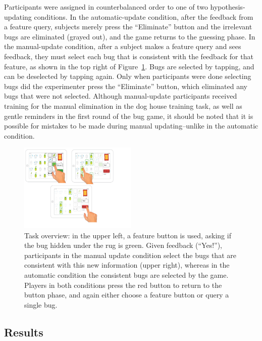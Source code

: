 \documentclass[10pt,letterpaper]{article}
\begin{document}
Participants were assigned in counterbalanced order to one of two hypothesis-
updating conditions. In the automatic-update condition, after the feedback from a 
feature query, subjects merely press the ``Eliminate'' button and the irrelevant bugs 
are eliminated (grayed out), and the game returns to the guessing phase. In the 
manual-update condition, after a subject makes a feature query and sees feedback, 
they must select each bug that is consistent with the feedback for that feature, as 
shown in the top right of Figure~\ref{fig:task-overview}. Bugs are selected by 
tapping, and can be deselected by tapping again. Only when participants were done 
selecting bugs did the experimenter press the ``Eliminate'' button, which eliminated 
any bugs that were not selected. Although manual-update participants received 
training for the manual elimination in the dog house training task, as well as gentle 
reminders in the first round of the bug game, it should be noted that it is possible for 
mistakes to be made during manual updating--unlike in the automatic condition.


\begin{figure}[!h]
  \centering
  \includegraphics[width=0.5\textwidth]{figures/task_overview}
  \caption{Task overview: in the upper left, a feature button is used, asking if the bug 
hidden under the rug is green. Given feedback (``Yes!''), participants in the manual 
update condition select the bugs that are consistent with this new information (upper 
right), whereas in the automatic condition the consistent bugs are selected by the 
game. Players in both conditions press the red button to return to the button phase, 
and again either choose a feature button or query a single bug.}
  \label{fig:task-overview}
\end{figure} 


\subsection{Results}
\end{document}
